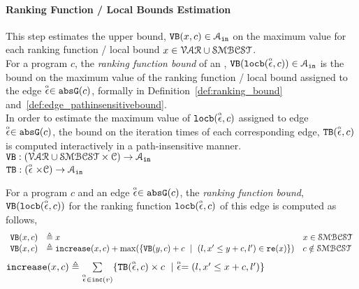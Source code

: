 \paragraph{Ranking Function / Local Bounds Estimation}
This step estimates the upper bound, $\varinvar(x, c) \in \mathcal{A}_{\lin}$
on the maximum value for each ranking function / local bound $x \in  \mathcal{VAR} \cup \constdom$.
\\
For a program $c$, the \emph{ranking function bound} of an ,
$\varinvar(\locbound(\absevent, c)) \in \mathcal{A}_{\lin}$ is 
the bound on the maximum value of the ranking function / local bound
assigned to the edge $\absevent \in \absG(c)$, formally in Definition~\ref{def:ranking_bound} and~\ref{def:edge_pathinsensitivebound}.
\\
In order to estimate the maximum value of $\locbound(\absevent, c)$ assigned to edge $\absevent \in \absG(c)$,
the bound on the iteration times of each corresponding edge, $\absclr(\absevent, c)$ 
is computed interactively in a path-insensitive manner.
\\ 
$ \varinvar: (\mathcal{VAR} \cup \constdom  \times \cdom) \to \mathcal{A}_{\lin}$
\\
$\absclr: (\absevent \times \cdom) \to \mathcal{A}_{\lin}$
\begin{defn}
  \label{def:ranking_bound}
For a program $c$ and an edge $\absevent \in \absG(c)$,
the \emph{ranking function bound}, $\varinvar(\locbound(\absevent, c))$ for the ranking function $\locbound(\absevent, c)$
of this edge
is computed as follows,
  \[ 
\begin{array}{lll}
  \varinvar(x, c) & \triangleq x & x \in \constdom \\
  \varinvar(x, c) & \triangleq \incrs(x, c) + \max(\{\varinvar(y, c) + c ~\mid~ (l, x' \leq y + c, l') \in \reset(x)\}) & c \notin \constdom
\end{array}
\]
%
$\incrs(x, c) \triangleq \sum\limits_{\absevent \in \inc(v)}\{\absclr(\absevent, c) \times c ~\mid~ \absevent = (l, x' \leq x + c, l')\}$
\end{defn}
